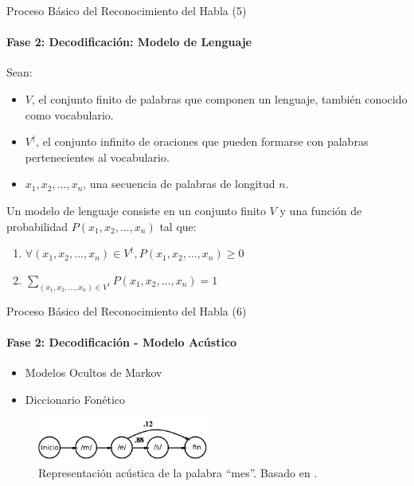 \begin{frame}{Proceso B\'asico del Reconocimiento del Habla (5)}
\framesubtitle{Fase 2: Decodificaci\'on: Modelo de Lenguaje}
Sean:
\begin{itemize}
    \item $V$, el conjunto finito de palabras que componen un lenguaje, tambi\'en conocido como vocabulario.
    \item $V^\dag$, el conjunto infinito de oraciones que pueden formarse con palabras pertenecientes 
        al vocabulario.
    \item $x_1,x_2,\ldots,x_n$, una secuencia de palabras de longitud $n$.
\end{itemize}

Un modelo de lenguaje \cite{CollinsLanguage} consiste en un conjunto finito $V$ y una funci\'on 
de probabilidad $P(x_1,x_2,\ldots,x_n)$ tal que:
\begin{enumerate}

\item $\forall (x_1,x_2,\ldots,x_n) \in V^\dag, P(x_1,x_2,\ldots,x_n) \ge 0$

\item $\displaystyle \sum_{(x_1,x_2,\ldots,x_n) \in V^\dag} P(x_1,x_2,\ldots,x_n) = 1$
\end{enumerate}
\end{frame}

\begin{frame}{Proceso B\'asico del Reconocimiento del Habla (6)}
\framesubtitle{Fase 2: Decodificaci\'on - Modelo Acústico}

\begin{itemize}
    \item Modelos Ocultos de Markov
    \item Diccionario Fonético
\end{itemize}

\begin{figure}[H] 
\centering
\includegraphics[width=0.5\textwidth]{./graphics/hmm_palabra.png}
\caption{Representaci\'on ac\'ustica de la palabra ``mes''. Basado en \cite{Jurafsky}.}
\label{figure:hmm-palabra}
\end{figure}

\end{frame}

